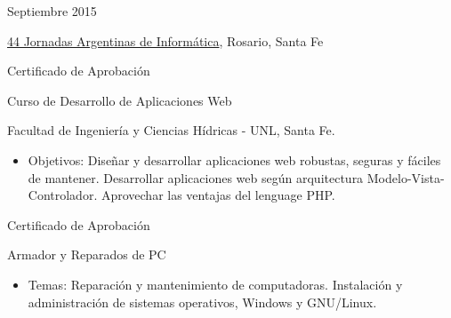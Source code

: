 \documentclass[a4paper,10pt]{article}
\newlength{\cvcolumngapwidth}
\newlength{\cvleftcolumnwidth}
\newlength{\cvrightcolumnwidth}
\newcommand{\cvsectionstyle}[1]{{\normalsize\cvsectionfont\textcolor{cvsectioncolor}{#1}}}
\newcommand{\cvtitlestyle}[1]{{\large\cvtitlefont\textcolor{cvtitlecolor}{#1}}}
\newcommand{\cvdurationstyle}[1]{{\small\cvdurationfont\textcolor{cvdurationcolor}{#1}}}
\newcommand{\cvheadingstyle}[1]{{\normalsize\cvheadingfont\textcolor{cvheadingcolor}{#1}}}
\newlength{\cvafteritemskipamount}
\newlength{\cvaftersectionskipamount}
\newlength{\cvbetweensectionandheadingextraskipamount}
\newlength{\cvaftertitleskipamount}
\newlength{\cvparskip}
\newcommand{\cvsection}[1]{
    \begin{minipage}[t]{\cvleftcolumnwidth}
        \raggedleft\cvsectionstyle{#1}
    \end{minipage}%
    \hspace{\cvcolumngapwidth}%
    \begin{minipage}[t]{\cvrightcolumnwidth}
        \textcolor{cvrulecolor}{\rule{\cvrightcolumnwidth}{0.3mm}}
    \end{minipage}

    \vspace{\cvaftersectionskipamount}
}
\newcommand{\cvitem}[2]{
    \begin{minipage}[t]{\cvleftcolumnwidth}
        \raggedleft #1
    \end{minipage}%
    \hspace{\cvcolumngapwidth}%
    \begin{minipage}[t]{\cvrightcolumnwidth}
        \setlength{\parskip}{\cvparskip} #2
    \end{minipage}

    \vspace{\cvafteritemskipamount}
}
\newcommand{\cvtitle}[1]{
    \cvtitlestyle{#1}

    \vspace{\cvaftertitleskipamount}
    \vspace{-\cvparskip}
}
\begin{document}
\cvitem{
    \cvdurationstyle{Septiembre 2015}
}{
    \cvheadingstyle{\href{http://44jaiio.sadio.org.ar/}{44 Jornadas Argentinas de Informática}}, Rosario, Santa Fe
}

\cvitem{
    \cvheadingstyle{Certificado de Aprobación}
}{
    \cvtitle{Curso de Desarrollo de Aplicaciones Web} Facultad de Ingeniería y Ciencias Hídricas - UNL, Santa Fe.
    \begin{itemize}
        \item Objetivos: Diseñar y desarrollar aplicaciones web robustas, seguras y fáciles de mantener. Desarrollar aplicaciones web según arquitectura Modelo-Vista-Controlador. Aprovechar las ventajas del lenguage PHP.
    \end{itemize}
}

\cvitem{
    \cvheadingstyle{Certificado de Aprobación}
}{
    \cvtitle{Armador y Reparados de PC}
    
    \begin{itemize}
        \item Temas: Reparación y mantenimiento de computadoras. Instalación y administración de sistemas operativos, Windows y GNU/Linux.
    \end{itemize}
}





\end{document}
